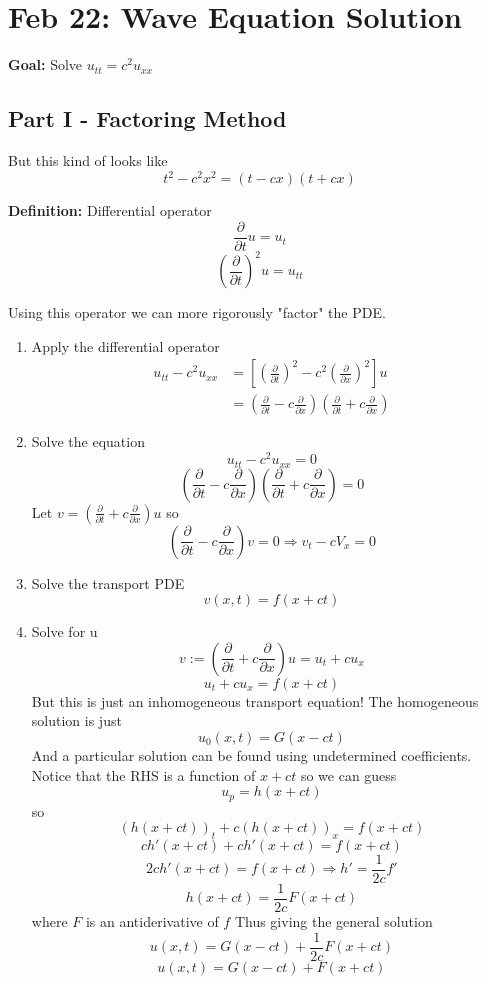\documentclass[12pt]{article}
\begin{document}
\section{Feb 22: Wave Equation Solution}
\textbf{Goal:} Solve $u_{tt} = c^2 u_{xx}$
\subsection*{Part I - Factoring Method}
But this kind of looks like 
\[t^2 - c^2 x^2 = (t - cx)(t + cx)\]

\textbf{Definition:} Differential operator
\[\frac{\partial}{\partial t} u = u_t\]
\[\left(\frac{\partial}{\partial t}\right)^2 u = u_{tt}\]

Using this operator we can more rigorously "factor" the PDE.

\begin{enumerate}
    \item Apply the differential operator 
    \begin{align*}
        u_{tt} - c^2 u_{xx} &= \left[\left(\frac{\partial}{\partial t}\right)^2 - c^2 \left(\frac{\partial}{\partial x}\right)^2\right]u\\
        &= \left(\frac{\partial}{\partial t} - c \frac{\partial}{\partial x}\right)\left(\frac{\partial}{\partial t} + c \frac{\partial}{\partial x}\right)
    \end{align*}
    \item Solve the equation 
    \[u_{tt} - c^2 u_{xx} = 0\]
    \[\left(\frac{\partial}{\partial t} - c \frac{\partial}{\partial x}\right)\left(\frac{\partial}{\partial t} + c \frac{\partial}{\partial x}\right) = 0\]
    Let $v = \left(\frac{\partial}{\partial t} + c \frac{\partial}{\partial x}\right)u$ 
    so 
    \[\left(\frac{\partial}{\partial t} - c \frac{\partial}{\partial x}\right)v = 0 \Longrightarrow v_t - cV_x = 0\]
    \item Solve the transport PDE 
    \[v(x, t) = f(x + ct)\]
    \item Solve for u 
    \[v := \left(\frac{\partial}{\partial t} + c \frac{\partial}{\partial x}\right)u = u_t + cu_x\]
    \[u_t + cu_x = f(x + ct)\]
    But this is just an inhomogeneous transport equation! 
    The homogeneous solution is just 
    \[u_0(x, t)= G(x - ct)\]
    And a particular solution can be found using undetermined coefficients. Notice that the RHS is a function of $x +ct$ so we can guess 
    \[u_p = h(x + ct)\]
    so 
    \[(h(x + ct))_t + c(h(x + ct))_x = f(x + ct)\]
    \[ch'(x+ ct) + ch'(x + ct) = f(x + ct)\]
    \[2ch'(x + ct) = f(x + ct) \Longrightarrow h' = \frac{1}{2c}f'\]
    \[h(x + ct) = \frac{1}{2c}F(x + ct)\]
    where $F$ is an antiderivative of $f$
    Thus giving the general solution
    \[u(x, t)= G(x - ct) + \frac{1}{2c}F(x + ct) \]
    \[\boxed{u(x, t) = G(x - ct) + F(x + ct)}\]
\end{enumerate}
\end{document}

